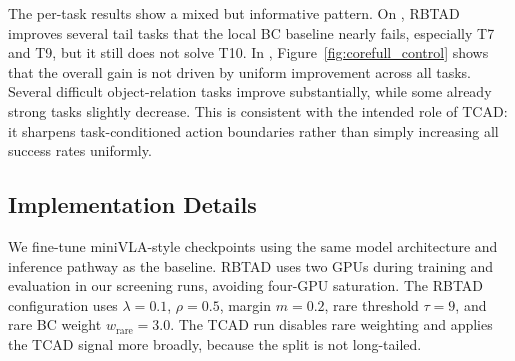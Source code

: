 The per-task results show a mixed but informative pattern. On \liberocorelt{}, RBTAD improves several tail tasks that the local BC baseline nearly fails, especially T7 and T9, but it still does not solve T10. In \liberocorefull{}, Figure~\ref{fig:corefull_control} shows that the overall gain is not driven by uniform improvement across all tasks. Several difficult object-relation tasks improve substantially, while some already strong tasks slightly decrease. This is consistent with the intended role of TCAD: it sharpens task-conditioned action boundaries rather than simply increasing all success rates uniformly.

\subsection{Implementation Details}

We fine-tune miniVLA-style checkpoints using the same model architecture and inference pathway as the baseline. RBTAD uses two GPUs during training and evaluation in our screening runs, avoiding four-GPU saturation. The \liberocorelt{} RBTAD configuration uses $\lambda=0.1$, $\rho=0.5$, margin $m=0.2$, rare threshold $\tau=9$, and rare BC weight $w_{\mathrm{rare}}=3.0$. The \liberocorefull{} TCAD run disables rare weighting and applies the TCAD signal more broadly, because the split is not long-tailed.


